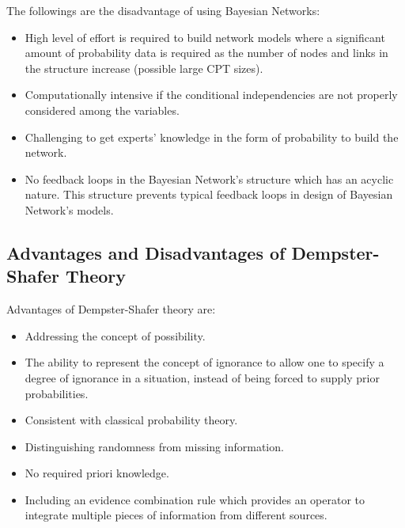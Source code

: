 \documentclass[11pt]{article}
\begin{document}
\noindent The followings are the disadvantage of using Bayesian Networks:

\begin{itemize}
  \item High level of effort is required to build network models where a
  significant amount of probability data is required as the number of nodes and
  links in the structure increase (possible large CPT sizes).
  
  \item Computationally intensive if the conditional independencies are not
  properly considered among the variables.
  
  \item Challenging to get experts' knowledge in the form of probability to
  build the network.
  
  \item No feedback loops in the Bayesian Network's structure which has an
  acyclic nature. This structure prevents typical feedback loops in design of
  Bayesian Network's models.
\end{itemize}

\subsection{Advantages and Disadvantages of Dempster-Shafer Theory}

Advantages of Dempster-Shafer theory are:

\begin{itemize}
  \item Addressing the concept of possibility.
  
  \item The ability to represent the concept of ignorance to allow one to
  specify a degree of ignorance in a situation, instead of being forced to
  supply prior probabilities.
  
  \item Consistent with classical probability theory.
  
  \item Distinguishing randomness from missing information.
  
  \item No required priori knowledge.
  
  \item Including an evidence combination rule which provides an operator to
  integrate multiple pieces of information from different sources.
\end{itemize}
\end{document}
